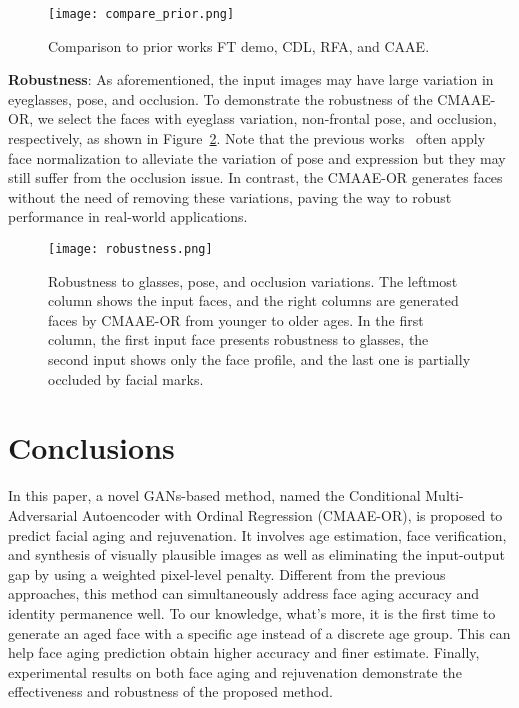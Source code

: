 \documentclass{article}
\begin{document}
\begin{figure}[!ht]
\centering
\texttt{[image: compare\_prior.png]}
\caption{Comparison to prior works FT demo, CDL, RFA, and CAAE.}
\label{compare_prior}
\end{figure}

{\bf\noindent Robustness}:
As aforementioned, the input images may have large variation in eyeglasses, pose, and occlusion. To demonstrate the robustness of the CMAAE-OR, we select the faces with eyeglass variation, non-frontal pose, and occlusion, respectively, as shown in Figure~\ref{robustness}. Note that the previous works~\cite{wang2016recurrent,kemelmacher2014illumination} often apply face normalization to alleviate the variation of pose and expression but they may still suffer from the occlusion issue. In contrast, the CMAAE-OR generates faces without the need of removing these variations, paving the way to robust performance in real-world applications.
\begin{figure}[!ht]
\centering
\texttt{[image: robustness.png]}
\caption{Robustness to glasses, pose, and occlusion variations. The leftmost column shows the input faces, and the right columns are generated faces by CMAAE-OR from younger to older ages. In the first column, the first input face presents robustness to glasses, the second input shows only the face profile, and the last one is partially occluded by facial marks.
}
\label{robustness}
\end{figure}

\section{Conclusions}\label{con}
In this paper, a novel GANs-based method, named the Conditional Multi-Adversarial Autoencoder with Ordinal Regression (CMAAE-OR), is proposed to predict facial aging and rejuvenation.  It involves age estimation, face verification, and synthesis of visually  plausible images as well as eliminating the input-output gap by using a weighted pixel-level penalty. Different from the previous approaches, this method can simultaneously address face aging accuracy and identity permanence well. To our knowledge, what's more, it is the first time to generate an aged face with a specific age instead of a discrete age group. This can help face aging prediction obtain higher accuracy and finer estimate. Finally, experimental results on both face aging and rejuvenation demonstrate the effectiveness and robustness of the proposed method.






\newpage

\end{document}
